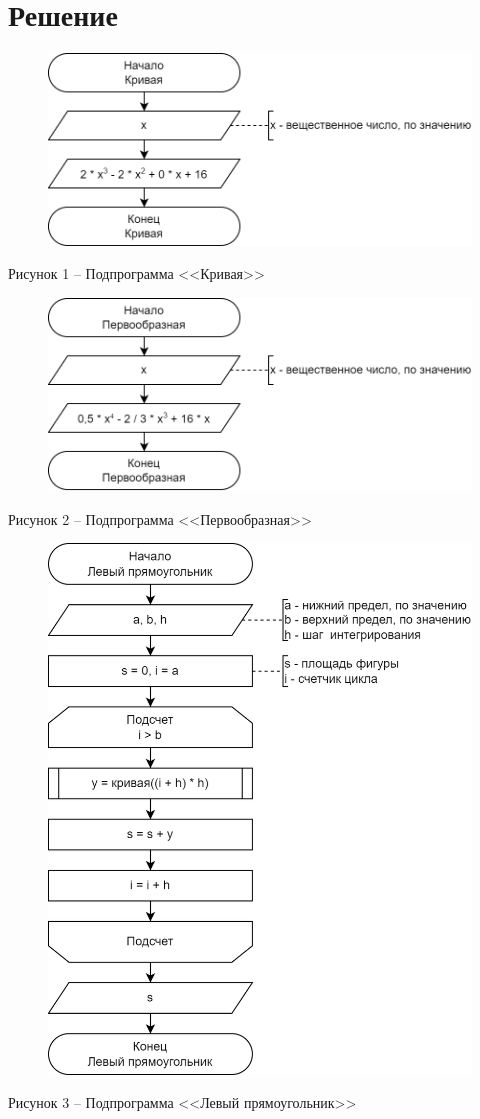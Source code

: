 \documentclass[a4paper,14pt]{extarticle}
\begin{document}
	\section*{Решение}
	\begin{figure}[h]
		\centering
		\includegraphics[width=0.6\linewidth]{images/s-1}
	\end{figure}
	\begin{center}
		Рисунок 1 – Подпрограмма <<Кривая>>
	\end{center}
	
	\pagebreak
	\begin{figure}[h]
		\centering
		\includegraphics[width=0.6\linewidth]{images/s-2}
	\end{figure}
	\begin{center}
		Рисунок 2 – Подпрограмма <<Первообразная>>
	\end{center}
	
	\begin{figure}[h]
		\centering
		\includegraphics[width=0.6\linewidth]{images/s-4}
	\end{figure}
	\begin{center}
		Рисунок 3 – Подпрограмма <<Левый прямоугольник>>
	\end{center}
	
\end{document}
